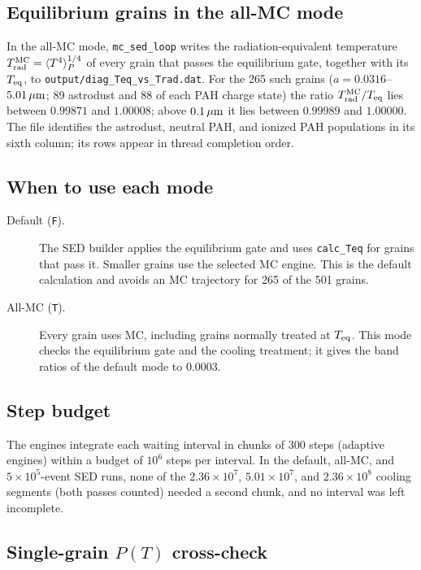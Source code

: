 \documentclass{my_memo}
\newcommand{\Teq}{T_{\rm eq}}
\newcommand{\umc}{\,\mu{\rm m}}
\begin{document}
\subsection{Equilibrium grains in the all-MC mode}

In the all-MC mode, \verb|mc_sed_loop| writes the radiation-equivalent
temperature $T_{\rm rad}^{\rm MC}=\langle T^4\rangle_P^{1/4}$ of every
grain that passes the equilibrium gate, together with its $\Teq$, to
\verb|output/diag_Teq_vs_Trad.dat|. For the 265 such grains
($a=0.0316$--$5.01\umc$; 89 astrodust and 88 of each PAH charge state)
the ratio $T_{\rm rad}^{\rm MC}/\Teq$ lies between $0.99871$ and
$1.00008$; above $0.1\umc$ it lies between $0.99989$ and $1.00000$.
The file identifies the astrodust, neutral PAH, and ionized PAH
populations in its sixth column; its rows appear in thread
completion order.

\subsection{When to use each mode}

\begin{description}
\item[Default (\texttt{F}).] The SED builder applies the equilibrium
gate and uses \texttt{calc\_Teq} for grains that pass it. Smaller
grains use the selected MC engine. This is the default calculation and
avoids an MC trajectory for 265 of the 501 grains.
\item[All-MC (\texttt{T}).] Every grain uses MC, including grains
normally treated at $\Teq$. This mode checks the equilibrium gate and
the cooling treatment; it gives the band ratios of the default mode to
$0.0003$.
\end{description}

\subsection{Step budget}

The engines integrate each waiting interval in chunks of 300 steps
(adaptive engines) within a budget of $10^6$ steps per interval. In
the default, all-MC, and $5\times10^5$-event SED runs, none of the
$2.36\times10^7$, $5.01\times10^7$, and $2.36\times10^8$ cooling
segments (both passes counted) needed a second chunk, and no interval
was left incomplete.

\subsection{Single-grain $P(T)$ cross-check}\label{sec:per_grain_pT}
\end{document}
